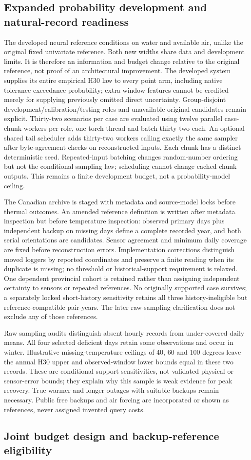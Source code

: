 \subsection{Expanded probability development and natural-record readiness}
The developed neural reference conditions on water and available air, unlike the original fixed univariate reference. Both new widths share data and development limits. It is therefore an information and budget change relative to the original reference, not proof of an architectural improvement. The developed system supplies its entire empirical H30 law to every point arm, including native tolerance-exceedance probability; extra window features cannot be credited merely for supplying previously omitted direct uncertainty. Group-disjoint development/calibration/testing roles and unavailable original candidates remain explicit. Thirty-two scenarios per case are evaluated using twelve parallel case-chunk workers per role, one torch thread and batch thirty-two each. An optional shared tail scheduler adds thirty-two workers calling exactly the same sampler after byte-agreement checks on reconstructed inputs. Each chunk has a distinct deterministic seed. Repeated-input batching changes random-number ordering but not the conditional sampling law; scheduling cannot change cached chunk outputs. This remains a finite development budget, not a probability-model ceiling.

The Canadian archive is staged with metadata and source-model locks before thermal outcomes. An amended reference definition is written after metadata inspection but before temperature inspection: observed primary days plus independent backup on missing days define a complete recorded year, and both serial orientations are candidates. Sensor agreement and minimum daily coverage are fixed before reconstruction errors. Implementation corrections distinguish moved loggers by reported coordinates and preserve a finite reading when its duplicate is missing; no threshold or historical-support requirement is relaxed. One dependent provincial cohort is retained rather than assigning independent certainty to sensors or repeated references. No originally supported case survives; a separately locked short-history sensitivity retains all three history-ineligible but reference-compatible pair-years. The later raw-sampling clarification does not exclude any of those references.

Raw sampling audits distinguish absent hourly records from under-covered daily means. All four selected deficient days retain some observations and occur in winter. Illustrative missing-temperature ceilings of 40, 60 and 100 degrees leave the annual H30 upper and observed-window lower bounds equal in these two records. These are conditional support sensitivities, not validated physical or sensor-error bounds; they explain why this sample is weak evidence for peak recovery. True warmer and longer outages with suitable backups remain necessary. Public free backups and air forcing are incorporated or shown as references, never assigned invented query costs.

\subsection{Joint budget design and backup-reference eligibility}




